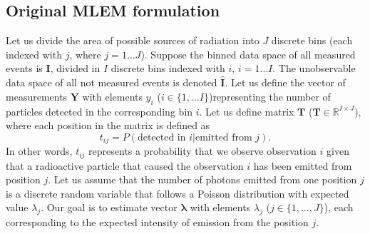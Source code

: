 \subsection{Original MLEM formulation}
Let us divide the area of possible sources of radiation into $J$ discrete bins (each indexed with $j$, where $j = 1 \dotsc J$).
Suppose the binned data space of all measured events is $\mathbf{I}$, divided in $I$ discrete bins indexed with $i$, $i = 1 \dotsc I$.
The unobservable data space of all not measured events is denoted $\mathbf{\hat{I}}$.
Let us define the vector of measurements $\mathbf{Y}$ with elements $y_{i}$ ($i \in \{1, \dots I\}$)representing the number of particles detected in the corresponding bin $i$.
Let us define matrix $\mathbf{T}$ ($\mathbf{T} \in \mathbb{R}^{I \times J}$), where each position in the matrix is defined as
\begin{equation}
  t_{ij} =  P(\textrm{detected in } i | \textrm{emitted from } j).
\end{equation}
In other words, $t_{ij}$ represents a probability that we observe observation $i$ given that a radioactive particle that caused the observation $i$ has been emitted from position $j$.
Let us assume that the number of photons emitted from one position $j$ is a discrete random variable that follows a Poisson distribution with expected value $\lambda_{j}$.
Our goal is to estimate vector $\bm{\lambda}$ with elements $\lambda_{j}$ ($j \in \{1 , \dots, J\}$), each corresponding to the expected intensity of emission from the position $j$.

